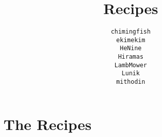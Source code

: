 \documentclass[12pt,a4paper,twoside]{book}
\title{Recipes}
\author{\texttt{chimingfish}\\%
		\texttt{ekimekim}\\%
		\texttt{HeNine}\\%
		\texttt{Hiramas}\\%
		\texttt{LambMower}\\%
		\texttt{Lunik}\\%
		\texttt{mithodin}\\%
}
\begin{document}
	\maketitle
	\tableofcontents
	\clearpage
	
	\chapter{The Recipes}

	
    \clearpage
	
    \clearpage
    
	\clearpage
	
	\clearpage
	
    \clearpage
    
	\clearpage
	
	\clearpage
	
	\clearpage
	
	\clearpage
	
	\clearpage
	
	\clearpage
	
	\clearpage
	
\end{document}
